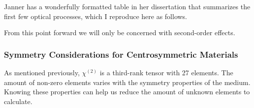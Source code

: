Janner \cite{janner1998exciton} has a wonderfully formatted table in her dissertation that summarizes the first few optical processes, which I reproduce here as follows.
\begin{table}[H]
\centering
{}
\caption{Optical processes described by $\chi^{(n)}(-\omega;\omega_{1},\ldots,\omega_{n})$\label{tab_janner}}
\end{table}

From this point forward we will only be concerned with second-order effects.

\subsubsection{Symmetry Considerations for Centrosymmetric Materials}\label{chap_theory_sym}
As mentioned previously, $\chi^{(2)}$ is a third-rank tensor with 27 elements. The amount of non-zero elements varies with the symmetry properties of the medium. Knowing these properties can help us reduce the amount of unknown elements to calculate.

